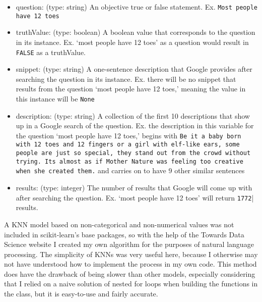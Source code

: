 \documentclass[]{article}
\begin{document}
		\begin{itemize}
			\item question: (type: string) An objective true or false statement. Ex. \texttt{Most people have 12 toes}
				
			\item truthValue: (type: boolean) A boolean value that corresponds to the question in its instance. Ex. `most people have 12 toes' as a question would result in \texttt{FALSE} as a truthValue.
				
			\item snippet: (type: string) A one-sentence description that Google provides after searching the question in its instance. Ex. there will be no snippet that results from the question `most people have 12 toes,' meaning the value in this instance will be \texttt{None}
				
			\item description: (type: string) A collection of the first 10 descriptions that show up in a Google search of the question. Ex. the description in this variable for the question `most people have 12 toes,' begins with \texttt{Be it a baby born with 12 toes and 12 fingers or a girl with elf-like ears, some people are just so special, they stand out from the crowd without trying. Its almost as if Mother Nature was feeling too creative when she created them.} and carries on to have 9 other similar sentences
				
			\item results: (type: integer) The number of results that Google will come up with after searching the question. Ex. `most people have 12 toes' will return \texttt{1772}| results.
		\end{itemize}
		
		A KNN model based on non-categorical and non-numerical values was not included in scikit-learn's base packages, so with the help of the Towards Data Science website \cite{tds} I created my own algorithm for the purposes of natural language processing. The simplicity of KNNs was very useful here, because I otherwise may not have understood how to implement the process in my own code. This method does have the drawback of being slower than other models, especially considering that I relied on a naive solution of nested for loops when building the functions in the class, but it is easy-to-use and fairly accurate. 
		
		
		
	
	
\end{document}
